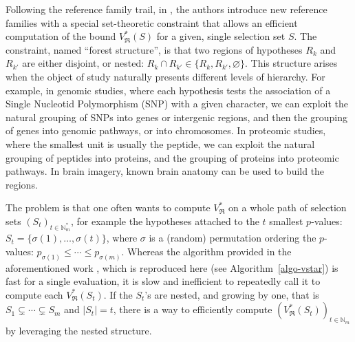 \documentclass[
  11pt,
  a4paper,
]{article}
\theoremstyle{plain}
\theoremstyle{plain}
\theoremstyle{definition}
\theoremstyle{plain}
\theoremstyle{definition}
\theoremstyle{remark}
\begin{document}
Following the reference family trail, in \citet{MR4178188}, the authors
introduce new reference families with a special set-theoretic constraint
that allows an efficient computation of the bound
\(V^*_{\mathfrak{R}}(S)\) for a given, single selection set \(S\). The
constraint, named ``forest structure'', is that two regions of
hypotheses \(R_k\) and \(R_{k'}\) are either disjoint, or nested:
\(R_k\cap R_{k'}\in\{R_k,R_{k'},\varnothing\}\). This structure arises
when the object of study naturally presents different levels of
hierarchy. For example, in genomic studies, where each hypothesis tests
the association of a Single Nucleotid Polymorphism (SNP) with a given
character, we can exploit the natural grouping of SNPs into genes or
intergenic regions, and then the grouping of genes into genomic
pathways, or into chromosomes. In proteomic studies, where the smallest
unit is usually the peptide, we can exploit the natural grouping of
peptides into proteins, and the grouping of proteins into proteomic
pathways. In brain imagery, known brain anatomy can be used to build the
regions.

The problem is that one often wants to compute \(V^*_{\mathfrak{R}}\) on
a whole path of selection sets \((S_t)_{t\in\mathbb{N}_m^*}\), for
example the hypotheses attached to the \(t\) smallest \(p\)-values:
\(S_t=\{\sigma(1),\dots,\sigma(t)\}\), where \(\sigma\) is a (random)
permutation ordering the \(p\)-values:
\(p_{\sigma(1)}\leq\dotsb\leq p_{\sigma(m)}\). Whereas the algorithm
provided in the aforementioned work \citep[Algorithm 1]{MR4178188},
which is reproduced here (see Algorithm~\ref{algo-vstar}) is fast for a
single evaluation, it is slow and inefficient to repeatedly call it to
compute each \(V^*_{\mathfrak{R}}(S_t)\). If the \(S_t\)'s are nested,
and growing by one, that is \(S_1\subsetneq\dotsb\subsetneq S_m\) and
\(|S_t|=t\), there is a way to efficiently compute
\(\left(V^*_{\mathfrak{R}}(S_t)\right)_{t\in\mathbb{N}_m}\) by
leveraging the nested structure.
\end{document}
